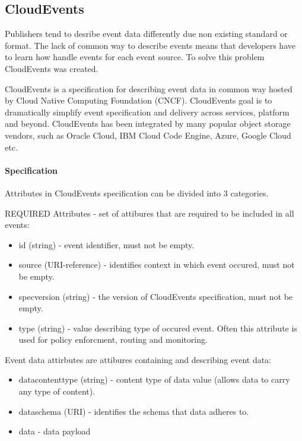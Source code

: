     \subsection{CloudEvents}
    Publishers tend to desribe event data differently due non existing standard or format. The lack of common way to describe events means that developers have to learn how handle events for each event source. To solve this problem CloudEvents was created.

    CloudEvents is a specification for describing event data in common way\cite{eventCloudEvents} hosted by Cloud Native Computing Foundation (CNCF)\cite{eventCNCF}. CloudEvents goal is to dramatically simplify event specification and delivery across services, platform and beyond.
    CloudEvents has been integrated by many popular object storage vendors, such as Oracle Cloud, IBM Cloud Code Engine, Azure, Google Cloud etc.

    \paragraph{Specification}
    Attributes in CloudEvents specification can be divided into 3 categories.

    REQUIRED Attributes - set of attibures that are required to be included in all events\cite{eventCloudEventsSpec}:
    \begin{itemize}
        \item id (string) - event identifier, must not be empty.
        \item source (URI-reference) - identifies context in which event occured, must not be empty.
        \item specversion (string) - the version of CloudEvents specification, must not be empty.
        \item type (string) - value describing type of occured event. Often this attribute is used for policy enforcment, routing and monitoring.
    \end{itemize}

    Event data attirbutes are attibures containing and describing event data:
    \begin{itemize}
        \item datacontenttype (string) - content type of data value (allows data to carry any type of content).
        \item dataschema (URI) - identifies the schema that data adheres to.
        \item data - data payload
    \end{itemize}

